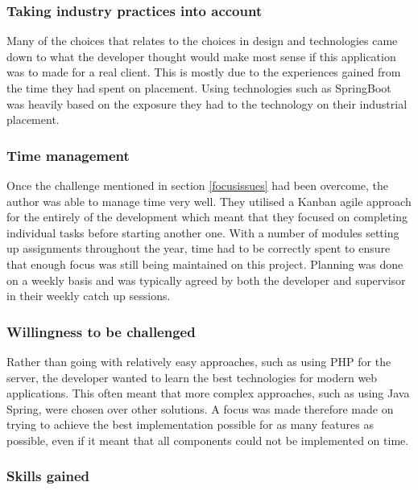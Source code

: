 \subsubsection*{Taking industry practices into account}
Many of the choices that relates to the choices in design and technologies came down to what the developer thought would make most sense if this application
was to made for a real client.
This is mostly due to the experiences gained from the time they had spent on placement.
Using technologies such as SpringBoot was heavily based on the exposure they had to the technology on their industrial placement.

\subsubsection*{Time management}
Once the challenge mentioned in section \ref{focusissues} had been overcome, the author was able to manage time very well.
They utilised a Kanban agile approach for the entirely of the development which meant that they focused on completing individual tasks before starting
another one. 
With a number of modules setting up assignments throughout the year, time had to be correctly spent to ensure that enough focus was still being maintained 
on this project.
Planning was done on a weekly basis and was typically agreed by both the developer and supervisor in their weekly catch up sessions. 

\subsubsection*{Willingness to be challenged}
Rather than going with relatively easy approaches, such as using PHP for the server, the developer wanted to learn the best technologies for modern web applications.
This often meant that more complex approaches, such as using Java Spring, were chosen over other solutions.
A focus was made therefore made on trying to achieve the best implementation possible for as many features as possible, even if it meant that all components 
could not be implemented on time.


\subsubsection{Skills gained}


